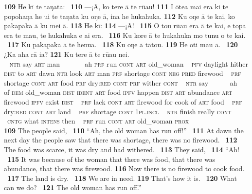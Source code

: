 {\largerpage
\medskip\gll
\textbf{\textup{109}} He kī te taŋata: ~\textbf{\textup{110}} —¡{\ꞌ}\=A, ko tere {\ꞌ}ā te rū{\ꞌ}au! \textbf{\textup{111}} I {\ꞌ}ōtea mai era ki te popohaŋa he u{\ꞌ}i te taŋata ku oŋe {\ꞌ}ā, {\ꞌ}ina he hukahuka. \textbf{\textup{112}} Ku oŋe {\ꞌ}ā te kai, ko pakapaka {\ꞌ}ā ku mei {\ꞌ}ā. \textbf{\textup{113}} He kī: \textbf{\textup{114}} —¡{\ꞌ}\=A! ~\textbf{\textup{115}} O tou rū{\ꞌ}au era {\ꞌ}ā te kai, e topa era te mau, te hukahuka e ai era. ~\textbf{\textup{116}} Ku kore {\ꞌ}ā te hukahuka mo tunu o te kai. ~\textbf{\textup{117}} Ku pakapaka {\ꞌ}ā te henua. ~\textbf{\textup{118}} Ku oŋe {\ꞌ}ā tātou. \textbf{\textup{119}} He oti mau {\ꞌ}ā. ~\textbf{\textup{120}} ¿Ka aha rā ia? \textbf{\textup{121}} Ku tere {\ꞌ}ā te rū{\ꞌ}au nei.\\
~ \textsc{ntr} say \textsc{art} man ~ ~~~~~ah \textsc{prf} run \textsc{cont} \textsc{art} old\_woman  ~ \textsc{pfv} daylight hither \textsc{dist} to \textsc{art} dawn \textsc{ntr} look \textsc{art} man \textsc{prf} shortage \textsc{cont} \textsc{neg} \textsc{pred} firewood ~ \textsc{prf} shortage \textsc{cont} \textsc{art} food \textsc{prf} dry:\textsc{red} \textsc{cont} \textsc{prf} wither \textsc{cont}  ~ \textsc{ntr} say ~ ~~~~ah ~ of \textsc{dem} old\_woman \textsc{dist} \textsc{ident} \textsc{art} food \textsc{ipfv} happen \textsc{dist} \textsc{art} abundance \textsc{art} firewood \textsc{ipfv} exist \textsc{dist} ~ \textsc{prf} lack \textsc{cont} \textsc{art} firewood for cook of \textsc{art} food ~ \textsc{prf} dry:\textsc{red} \textsc{cont} \textsc{art} land ~ \textsc{prf} shortage \textsc{cont} \textsc{1pl.incl}  ~ \textsc{ntr} finish really \textsc{cont} ~ ~\textsc{cntg} what \textsc{intens} then  ~ \textsc{prf} run \textsc{cont} \textsc{art} old\_woman \textsc{prox}\\

\medskip\glt
\textbf{\textup{109}} The people said, ~\textbf{\textup{110}} “Ah, the old woman has run off!” ~\textbf{\textup{111}} At dawn the next day the people saw that there was shortage, there was no firewood. ~\textbf{\textup{112}} The food was scarce, it was dry and had withered. ~\textbf{\textup{113}} They said, ~\textbf{\textup{114}} “Ah! ~\textbf{\textup{115}} It was because of the woman that there was food, that there was abundance, that there was firewood. \textbf{\textup{116}} Now there is no firewood to cook food. ~\textbf{\textup{117}} The land is dry. ~\textbf{\textup{118}} We are in need. \textbf{\textup{119}} That’s how it is. ~\textbf{\textup{120}} What can we do? ~\textbf{\textup{121}} The old woman has run off.”


}

